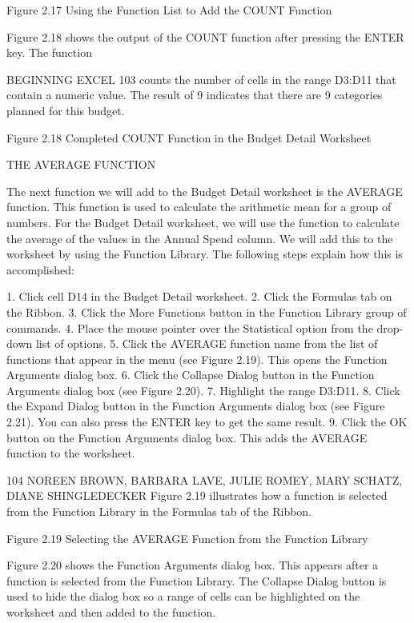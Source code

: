 Figure 2.17 Using the Function List to Add the COUNT Function


Figure 2.18 shows the output of the COUNT function after pressing the ENTER key. The function



BEGINNING EXCEL 103
counts the number of cells in the range D3:D11 that contain a numeric value. The result of 9 indicates
that there are 9 categories planned for this budget.




Figure 2.18 Completed COUNT Function in the Budget Detail Worksheet


THE AVERAGE FUNCTION

The next function we will add to the Budget Detail worksheet is the AVERAGE function. This
function is used to calculate the arithmetic mean for a group of numbers. For the Budget
Detail worksheet, we will use the function to calculate the average of the values in the Annual Spend
column. We will add this to the worksheet by using the Function Library. The following steps explain
how this is accomplished:

1.   Click cell D14 in the Budget Detail worksheet.
2.   Click the Formulas tab on the Ribbon.
3.   Click the More Functions button in the Function Library group of commands.
4.   Place the mouse pointer over the Statistical option from the drop-down list of options.
5.   Click the AVERAGE function name from the list of functions that appear in the menu (see
Figure 2.19). This opens the Function Arguments dialog box.
6.   Click the Collapse Dialog button in the Function Arguments dialog box (see Figure 2.20).
7.   Highlight the range D3:D11.
8.   Click the Expand Dialog button in the Function Arguments dialog box (see Figure 2.21). You can
also press the ENTER key to get the same result.
9.   Click the OK button on the Function Arguments dialog box. This adds the AVERAGE function
to the worksheet.


104 NOREEN BROWN, BARBARA LAVE, JULIE ROMEY, MARY SCHATZ, DIANE SHINGLEDECKER
Figure 2.19 illustrates how a function is selected from the Function Library in the Formulas tab of the
Ribbon.




Figure 2.19 Selecting the AVERAGE Function from the Function Library


Figure 2.20 shows the Function Arguments dialog box. This appears after a function is selected from
the Function Library. The Collapse Dialog button is used to hide the dialog box so a range of cells can
be highlighted on the worksheet and then added to the function.




